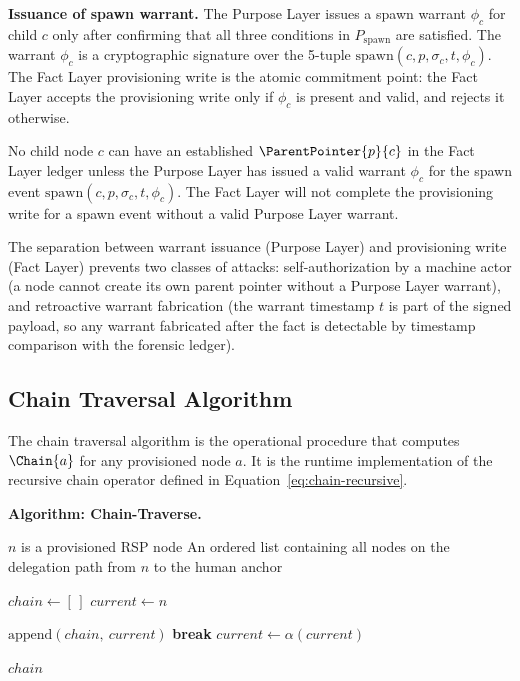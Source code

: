 \medskip
\noindent\textbf{Issuance of spawn warrant.} The Purpose Layer issues a spawn warrant $\phi_c$ for child $c$ only after confirming that all three conditions in $P_{\mathrm{spawn}}$ are satisfied. The warrant $\phi_c$ is a cryptographic signature over the 5-tuple $\mathrm{spawn}(c, p, \sigma_c, t, \phi_c)$. The Fact Layer provisioning write is the atomic commitment point: the Fact Layer accepts the provisioning write only if $\phi_c$ is present and valid, and rejects it otherwise.

\begin{prop}
\label{prop:warrant-prerequisite}
No child node $c$ can have an established $\ParentPointer{p}{c}$ in the Fact Layer ledger unless the Purpose Layer has issued a valid warrant $\phi_c$ for the spawn event $\mathrm{spawn}(c, p, \sigma_c, t, \phi_c)$. The Fact Layer will not complete the provisioning write for a spawn event without a valid Purpose Layer warrant.
\end{prop}

The separation between warrant issuance (Purpose Layer) and provisioning write (Fact Layer) prevents two classes of attacks: self-authorization by a machine actor (a node cannot create its own parent pointer without a Purpose Layer warrant), and retroactive warrant fabrication (the warrant timestamp $t$ is part of the signed payload, so any warrant fabricated after the fact is detectable by timestamp comparison with the forensic ledger).

\subsection{Chain Traversal Algorithm}
\label{sec:chain-traversal-algorithm}

The chain traversal algorithm is the operational procedure that computes $\Chain{a}$ for any provisioned node $a$. It is the runtime implementation of the recursive chain operator defined in Equation~\ref{eq:chain-recursive}.

\medskip
\noindent\textbf{Algorithm: Chain-Traverse.}

\begin{algorithm}
\caption{Chain-Traverse($n$) --- Compute the delegation chain from node $n$ to the human anchor}
\label{alg:chain-traverse}
\begin{algorithmic}[1]
\REQUIRE $n$ is a provisioned RSP node
\ENSURE An ordered list containing all nodes on the delegation path from $n$ to the human anchor

\STATE $chain \leftarrow [\,]$
\STATE $current \leftarrow n$ 

    \STATE $\text{append}(chain,\ current)$ 
        \STATE \textbf{break} 
    \ENDIF
    \STATE $current \leftarrow \alpha(current)$ 
\ENDWHILE

\RETURN $chain$
\end{algorithmic}
\end{algorithm}

